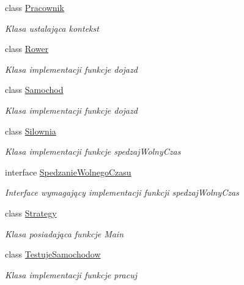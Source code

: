 \begin{DoxyCompactItemize}
class \hyperlink{class_strategy_1_1_pracownik}{Pracownik}
\begin{DoxyCompactList}\small\item\em Klasa ustalająca kontekst \end{DoxyCompactList}\item 
class \hyperlink{class_strategy_1_1_rower}{Rower}
\begin{DoxyCompactList}\small\item\em Klasa implementacji funkcje dojazd \end{DoxyCompactList}\item 
class \hyperlink{class_strategy_1_1_samochod}{Samochod}
\begin{DoxyCompactList}\small\item\em Klasa implementacji funkcje dojazd \end{DoxyCompactList}\item 
class \hyperlink{class_strategy_1_1_silownia}{Silownia}
\begin{DoxyCompactList}\small\item\em Klasa implementacji funkcje spedzaj\+Wolny\+Czas \end{DoxyCompactList}\item 
interface \hyperlink{interface_strategy_1_1_spedzanie_wolnego_czasu}{Spedzanie\+Wolnego\+Czasu}
\begin{DoxyCompactList}\small\item\em Interface wymagający implementacji funkcji spedzaj\+Wolny\+Czas \end{DoxyCompactList}\item 
class \hyperlink{class_strategy_1_1_strategy}{Strategy}
\begin{DoxyCompactList}\small\item\em Klasa posiadająca funkcje Main \end{DoxyCompactList}\item 
class \hyperlink{class_strategy_1_1_testuje_samochodow}{Testuje\+Samochodow}
\begin{DoxyCompactList}\small\item\em Klasa implementacji funkcje pracuj \end{DoxyCompactList}\end{DoxyCompactItemize}
